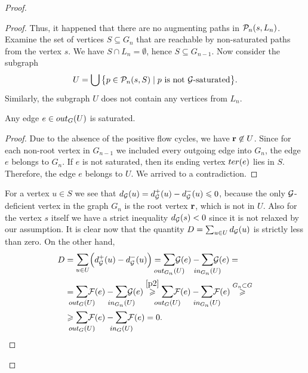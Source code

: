 \documentclass[12pt,oneside,a4paper]{amsart}
\begin{document}
\begin{proof}
\begin{proof}
          Thus, it happened that there are no augmenting paths in $\gnpaths(s, L_n)$.
          Examine the set of vertices $S \subseteq G_n$ that are reachable by non-saturated paths from the vertex $s$.
          We have $S \cap L_n = \emptyset$, hence $S \subseteq G_{n-1}$.
          Now consider the subgraph
            \[
              U = \bigcup\big\{p \in \gnpaths(s, S) \mid \text{$p$ is not $\cal{G}$-saturated}\big\}.
            \]
          Similarly, the subgraph $U$ does not contain any vertices from $L_n$.
          \begin{lemma}
            Any edge $e \in \eout_G(U)$ is saturated.
          \end{lemma}
          \begin{proof}
            Due to the absence of the positive flow cycles, we have $\root \not \in U$.
            Since for each non-root vertex in $G_{n-1}$ we included every outgoing edge into $G_n$,
              the edge $e$ belongs to $G_n$.
            If $e$ is not saturated, then its ending vertex $\ter(e)$ lies in $S$.
            Therefore, the edge $e$ belongs to $U$.
            We arrived to a contradiction.
          \end{proof}
          For a vertex $u \in S$ we see that $d_{\cal{G}}(u) = d^{+}_{\cal{G}}(u) - d^{-}_{\cal{G}}(u) \leq 0$, because
            the only $\cal{G}$-deficient vertex in the graph $G_n$ is the root vertex $\root$, which is not in $U$.
          Also for the vertex $s$ itself we have a strict inequality $d_{\cal{G}}(s) < 0$ since it is not relaxed by our assumption.
          It is clear now that the quantity $D = \sum_{u \in U} d_{\cal{G}}(u)$ is strictly less than zero.
          On the other hand,
          \[
            \begin{split}
              D &= \mathlarger\sum_{u \in U} \Big(d^{+}_{\cal{G}}(u) - d^{-}_{\cal{G}}(u)\Big)
              = \mathlarger{\smashoperator{\sum_{\eout_{G_n}(U)}}} \cal{G}(e) - \mathlarger{\smashoperator{\sum_{\ein_{G_n}(U)}}} \cal{G}(e) = \\
              &= \mathlarger{\smashoperator{\sum_{\eout_{G}(U)}}} \flowpos(e) - \mathlarger{\smashoperator{\sum_{\ein_{G_n}(U)}}} \cal{G}(e)
                \overset{\ref{p2}}{\geq} \mathlarger{\smashoperator{\sum_{\eout_G(U)}}} \flowpos(e) - \mathlarger{\smashoperator{\sum_{\ein_{G_n}(U)}}} \flowpos(e) 
                \overset{G_n \subset G} \geq \\
              &\geq \mathlarger{\smashoperator{\sum_{\eout_G(U)}}} \flowpos(e) - \mathlarger{\smashoperator{\sum_{\ein_{G}(U)}}} \flowpos(e) = 0.

\end{split}\]
\end{proof}
\end{proof}
\end{document}
